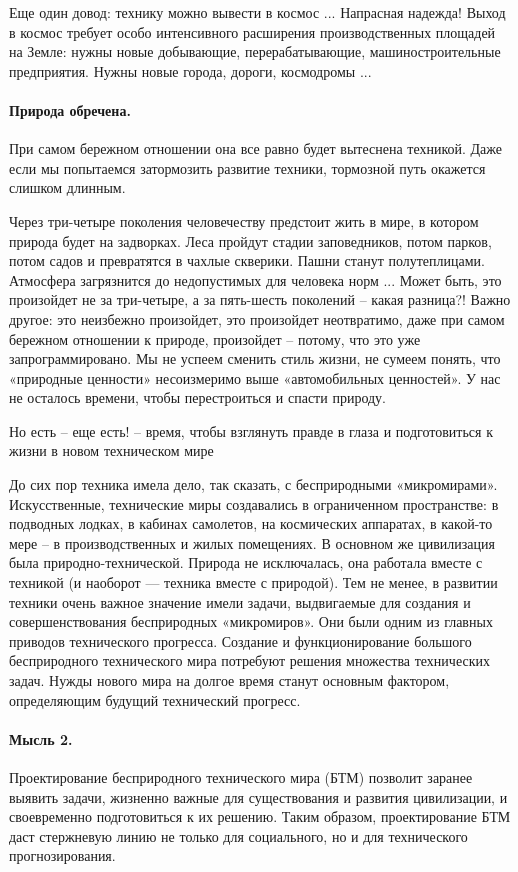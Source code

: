 \documentclass[11pt,a4paper]{article}
\begin{document}
Еще один довод: технику можно вывести в космос ... Напрасная надежда! Выход в
космос требует особо интенсивного расширения производственных площадей на
Земле: нужны новые добывающие, перерабатывающие, машиностроительные
предприятия. Нужны новые города, дороги, космодромы ...

\paragraph{Природа обречена.}
При самом бережном отношении она все равно будет вытеснена техникой. Даже если
мы попытаемся затормозить развитие техники, тормозной путь окажется слишком
длинным.

Через три-четыре поколения человечеству предстоит жить в мире, в котором
природа будет на задворках. Леса пройдут стадии заповедников, потом парков,
потом садов и превратятся в чахлые скверики. Пашни станут полутеплицами.
Атмосфера загрязнится до недопустимых для человека норм ... Может быть, это
произойдет не за три-четыре, а за пять-шесть поколений -- какая разница?!
Важно другое: это неизбежно произойдет, это произойдет неотвратимо, даже при
самом бережном отношении к природе, произойдет -- потому, что это уже
запрограммировано. Мы не успеем сменить стиль жизни, не сумеем понять, что
«природные ценности» несоизмеримо выше «автомобильных ценностей». У нас не
осталось времени, чтобы перестроиться и спасти природу.

Но есть -- еще есть! -- время, чтобы взглянуть правде в глаза и подготовиться
к жизни в новом техническом мире

До сих пор техника имела дело, так сказать, с бесприродными «микромирами».
Искусственные, технические миры создавались в ограниченном пространстве: в
подводных лодках, в кабинах самолетов, на космических аппаратах, в какой-то
мере -- в производственных и жилых помещениях. В основном же цивилизация была
природно-технической. Природа не исключалась, она работала вместе с техникой
(и наоборот — техника вместе с природой).  Тем не менее, в развитии техники
очень важное значение имели задачи, выдвигаемые для создания и
совершенствования бесприродных «микромиров». Они были одним из главных
приводов технического прогресса. Создание и функционирование большого
бесприродного технического мира потребуют решения множества технических задач.
Нужды нового мира на долгое время станут основным фактором, определяющим
будущий технический прогресс.

\paragraph{Мысль 2.}
Проектирование бесприродного технического мира (БТМ) позволит заранее выявить
задачи, жизненно важные для существования и развития цивилизации, и
своевременно подготовиться к их решению. Таким образом, проектирование БТМ
даст стержневую линию не только для социального, но и для технического
прогнозирования.
\end{document}
